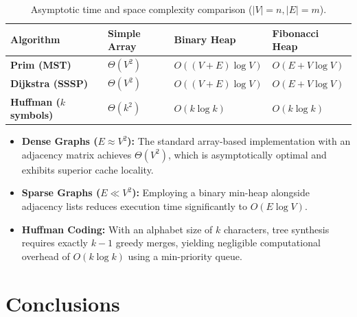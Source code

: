 \documentclass[11pt,a4paper]{article}
\begin{document}
\begin{table}[H]
\centering
\small
\caption{Asymptotic time and space complexity comparison ($|V| = n, |E| = m$).}
\label{tab:complexities}
\begin{tabular}{p{3.5cm} p{2.8cm} p{4.0cm} p{3.8cm}}
\toprule
\textbf{Algorithm} & \textbf{Simple Array} & \textbf{Binary Heap} & \textbf{Fibonacci Heap} \\
\midrule
\textbf{Prim (MST)} & $\Theta(V^2)$ & $O((V + E) \log V)$ & $O(E + V \log V)$ \\
\textbf{Dijkstra (SSSP)} & $\Theta(V^2)$ & $O((V + E) \log V)$ & $O(E + V \log V)$ \\
\textbf{Huffman ($k$ symbols)} & $\Theta(k^2)$ & $O(k \log k)$ & $O(k \log k)$ \\
\bottomrule
\end{tabular}
\end{table}

\begin{itemize}
    \item \textbf{Dense Graphs ($E \approx V^2$):} The standard array-based implementation with an adjacency matrix achieves $\Theta(V^2)$, which is asymptotically optimal and exhibits superior cache locality.
    \item \textbf{Sparse Graphs ($E \ll V^2$):} Employing a binary min-heap alongside adjacency lists reduces execution time significantly to $O(E \log V)$.
    \item \textbf{Huffman Coding:} With an alphabet size of $k$ characters, tree synthesis requires exactly $k-1$ greedy merges, yielding negligible computational overhead of $O(k \log k)$ using a min-priority queue.
\end{itemize}

\section{Conclusions}
\end{document}
